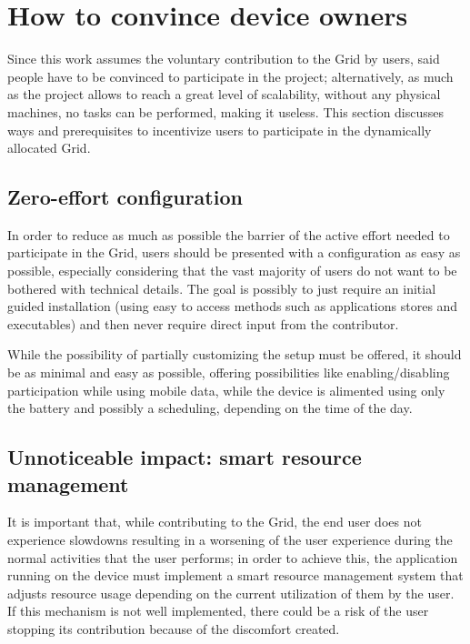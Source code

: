 \section{How to convince device owners}
Since this work assumes the voluntary contribution to the Grid by users, said people have to be convinced to participate in the project; alternatively, as much as the project allows to reach a great level of scalability, without any physical machines, no tasks can be performed, making it useless. This section discusses ways and prerequisites to incentivize users to participate in the dynamically allocated Grid.

\subsection{Zero-effort configuration}
In order to reduce as much as possible the barrier of the active effort needed to participate in the Grid, users should be presented with a configuration as easy as possible, especially considering that the vast majority of users do not want to be bothered with technical details. The goal is possibly to just require an initial guided installation (using easy to access methods such as applications stores and executables) and then never require direct input from the contributor.

While the possibility of partially customizing the setup must be offered, it should be as minimal and easy as possible, offering possibilities like enabling/disabling participation while using mobile data, while the device is alimented using only the battery and possibly a scheduling, depending on the time of the day. 

\subsection{Unnoticeable impact: smart resource management}
It is important that, while contributing to the Grid, the end user does not experience slowdowns resulting in a worsening of the user experience during the normal activities that the user performs; in order to achieve this, the application running on the device must implement a smart resource management system that adjusts resource usage depending on the current utilization of them by the user. If this mechanism is not well implemented, there could be a risk of the user stopping its contribution because of the discomfort created.

